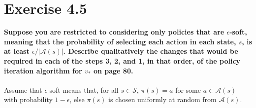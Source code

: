 \documentclass[a4paper,11pt]{article}
\numberwithin{equation}{section}
\theoremstyle{remark}
\begin{document}
\section{Exercise 4.5}

\textbf{Suppose you are restricted to considering only policies that are $\epsilon$-soft, meaning that the probability of selecting each action in each state, $s$, is at least $\epsilon/|\mathcal{A}(s)|$. Describe qualitatively the changes that would be required in each of the steps 3, 2, and 1, in that order, of the policy iteration algorithm for $v_*$ on page 80.}
\\ \\
Assume that $\epsilon$-soft means that, for all $s \in \mathcal{S}$, $\pi(s) = a$ for some $a \in \mathcal{A}(s)$ with probability $1-\epsilon$, else $\pi(s)$ is chosen uniformly at random from $\mathcal{A}(s)$.
\end{document}
